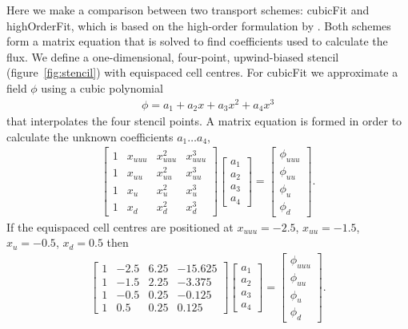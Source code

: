 \documentclass{article}
\begin{document}
Here we make a comparison between two transport schemes: cubicFit \citep{shaw2017} and highOrderFit, which is based on the high-order formulation by \citet{devendran2017}.  Both schemes form a matrix equation that is solved to find coefficients used to calculate the flux.  We define a one-dimensional, four-point, upwind-biased stencil (figure~\ref{fig:stencil}) with equispaced cell centres.
For cubicFit we approximate a field $\phi$ using a cubic polynomial 
\begin{align}
\phi = a_1 + a_2 x + a_3 x^2 + a_4 x^3
\end{align}
that interpolates the four stencil points.  A matrix equation is formed in order to calculate the unknown coefficients $a_1 \ldots a_4$,
\begin{align}
	\begin{bmatrix}
		1 & x_{uuu} & x_{uuu}^2 & x_{uuu}^3 \\
		1 & x_{uu}  & x_{uu}^2  & x_{uu}^3 \\
		1 & x_u     & x_u^2     & x_u^3 \\
		1 & x_d     & x_d^2     & x_d^3
	\end{bmatrix}
	\begin{bmatrix}
		a_1 \\
		a_2 \\
		a_3 \\
		a_4
	\end{bmatrix}
	=
	\begin{bmatrix}
		\phi_{uuu} \\
		\phi_{uu} \\
		\phi_u \\
		\phi_d
	\end{bmatrix}
	\text{.}
\end{align}
If the equispaced cell centres are positioned at $x_{uuu} = -2.5$, $x_{uu} = -1.5$, $x_u = -0.5$, $x_d = 0.5$ then
\begin{align}
	\begin{bmatrix}
		1 & -2.5 & 6.25 & -15.625 \\
		1 & -1.5 & 2.25 & -3.375 \\
		1 & -0.5 & 0.25 & -0.125 \\
		1 &  0.5 & 0.25 &  0.125
	\end{bmatrix}
	\begin{bmatrix}
		a_1 \\
		a_2 \\
		a_3 \\
		a_4
	\end{bmatrix}
	=
	\begin{bmatrix}
		\phi_{uuu} \\
		\phi_{uu} \\
		\phi_u \\
		\phi_d
	\end{bmatrix}
	\text{.}
	\label{eq:cubicFitMatrix}
\end{align}
\end{document}

